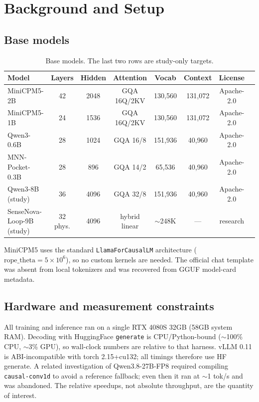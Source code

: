 \documentclass[11pt,a4paper]{article}
\begin{document}
\section{Background and Setup}
\subsection{Base models}
\begin{table}[h]
\centering
\begin{tabular}{lccccccc}
\toprule
Model & Layers & Hidden & Attention & Vocab & Context & License\\
\midrule
MiniCPM5-2B & 42 & 2048 & GQA 16Q/2KV & 130,560 & 131,072 & Apache-2.0\\
MiniCPM5-1B & 24 & 1536 & GQA 16Q/2KV & 130,560 & 131,072 & Apache-2.0\\
Qwen3-0.6B & 28 & 1024 & GQA 16/8 & 151,936 & 40,960 & Apache-2.0\\
MNN-Pocket-0.3B & 28 & 896 & GQA 14/2 & 65,536 & 40,960 & Apache-2.0\\
Qwen3-8B (study) & 36 & 4096 & GQA 32/8 & 151,936 & 40,960 & Apache-2.0\\
SenseNova-Loop-9B (study) & 32 phys. & 4096 & hybrid linear & $\sim$248K & --- & research\\
\bottomrule
\end{tabular}
\caption{Base models. The last two rows are study-only targets.}
\end{table}
MiniCPM5 uses the standard \texttt{LlamaForCausalLM} architecture ($\text{rope\_theta}=5\times10^6$),
so no custom kernels are needed. The official chat template was absent from local tokenizers
and was recovered from GGUF model-card metadata.

\subsection{Hardware and measurement constraints}
All training and inference ran on a single RTX 4080S 32GB (58GB system RAM). Decoding with
HuggingFace \texttt{generate} is CPU/Python-bound ($\sim$100\% CPU, $\sim$3\% GPU), so
wall-clock numbers are relative to that harness. vLLM 0.11 is ABI-incompatible with torch
2.15+cu132; all timings therefore use HF generate. A related investigation of
Qwen3.8-27B-FP8 required compiling \texttt{causal-conv1d} to avoid a reference fallback;
even then it ran at $\sim$1 tok/s and was abandoned. The relative speedups, not absolute
throughput, are the quantity of interest.
\end{document}
